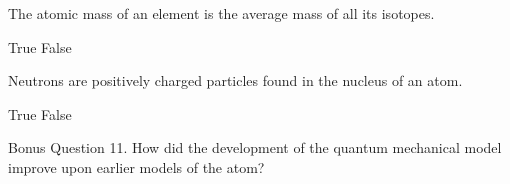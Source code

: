 \documentclass{exam}
\begin{document}
\begin{questions}
\question[2] The atomic mass of an element is the average mass of all its isotopes.  
\begin{checkboxes}
    \choice True
    \choice False
\end{checkboxes}


\question[2] Neutrons are positively charged particles found in the nucleus of an atom.  
\begin{checkboxes}
    \choice True
    \choice False
\end{checkboxes}


Bonus Question
11. How did the development of the quantum mechanical model improve upon earlier models of the atom?  





\end{questions}
\end{document}
